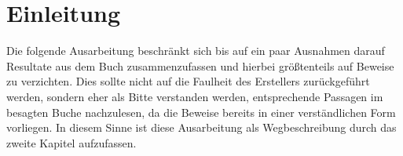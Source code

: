 \section*{Einleitung}

Die folgende Ausarbeitung beschränkt sich bis auf ein paar Ausnahmen darauf Resultate aus dem Buch \cite{preuss} zusammenzufassen und hierbei größtenteils auf Beweise zu verzichten. 
Dies sollte nicht auf die Faulheit des Erstellers zurückgeführt werden, sondern eher als Bitte verstanden werden, entsprechende Passagen im besagten Buche nachzulesen, da die Beweise bereits in einer verständlichen Form vorliegen.
In diesem Sinne ist diese Ausarbeitung als Wegbeschreibung durch das zweite Kapitel aufzufassen.
